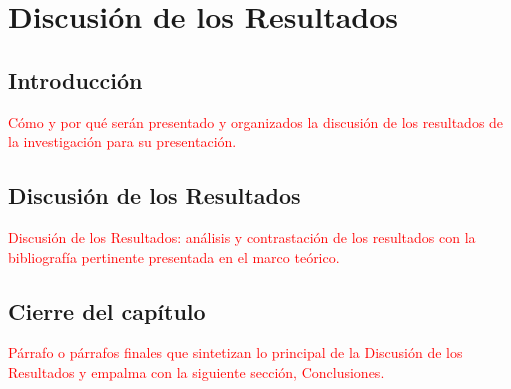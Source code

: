 \chapter{Discusión de los Resultados}
\thispagestyle{empty}

\section{Introducción}

\textcolor{red}{Cómo y por qué serán presentado y organizados la discusión de los resultados de la
investigación para su presentación.}


\section{Discusión de los Resultados}

\textcolor{red}{Discusión de los Resultados: análisis y contrastación de los resultados con la bibliografía
pertinente presentada en el marco teórico.}


\section{Cierre del capítulo}

\textcolor{red}{ Párrafo o párrafos finales que sintetizan lo principal de la Discusión de los Resultados y
empalma con la siguiente sección, Conclusiones.}
